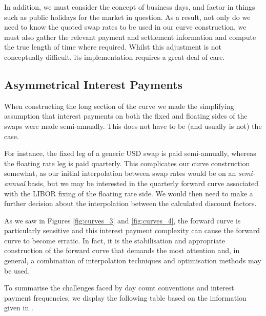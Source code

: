 In addition, we must consider the concept of business days, and factor in things such as public holidays for the market in question. As a result, not only do we need to know the quoted swap rates to be used in our curve construction, we must also gather the relevant payment and settlement information and compute the true length of time where required. Whilst this adjustment is not conceptually difficult, its implementation requires a great deal of care.

\subsection{Asymmetrical Interest Payments}
When constructing the long section of the curve we made the simplifying assumption that interest payments on both the fixed and floating sides of the swaps were made semi-annually. This does not have to be (and usually is not) the case. 

For instance, the fixed leg of a generic USD swap is paid semi-annually, whereas the floating rate leg is paid quarterly. This complicates our curve construction somewhat, as our initial interpolation between swap rates would be on an \textit{semi-annual} basis, but we may be interested in the quarterly forward curve associated with the LIBOR fixing of the floating rate side. We would then need to make a further decision about the interpolation between the calculated discount factors. 

\newpage

As we saw in Figures \ref{fig:curves_3} and \ref{fig:curves_4}, the forward curve is particularly sensitive and this interest payment complexity can cause the forward curve to become erratic. In fact, it is the stabilisation and appropriate construction of the forward curve that demands the most attention and, in general, a combination of interpolation techniques and optimisation methods may be used. 

To summarise the challenges faced by day count conventions and interest payment frequencies, we display the following table based on the information given in \cite{sadr2009interest}.

\vspace{1cm}

